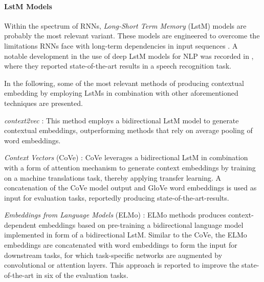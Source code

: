 \documentclass[11pt]{scrreprt}
\let\citef\cite  %
\let\cite\parencite  %
\begin{document}

\paragraph{L\gls{st}M Models}
Within the spectrum of RNNs, \textit{Long-Short Term Memory} (L\gls{st}M) models are probably the most relevant variant. These models are engineered to overcome the limitations RNNs face with long-term dependencies in input sequences \cite{hochreiterLongShortTermMemory1997, yuReviewRecurrentNeural2019}. A notable development in the use of deep L\gls{st}M models for NLP was recorded in \citef{gravesSpeechRecognitionDeep2013}, where they reported state-of-the-art results in a speech recognition task.


In the following, some of the most relevant methods of producing contextual embedding by employing
L\gls{st}Ms in combination with other aforementioned techniques are presented.

\textit{context2vec} \cite{melamudContext2vecLearningGeneric2016}: This method employs a bidirectional L\gls{st}M model to generate contextual embeddings, outperforming methods that rely on average pooling of word embeddings.

\textit{Context Vectors} (CoVe) \cite{mccannLearnedTranslationContextualized2018}: CoVe leverages a bidirectional L\gls{st}M in combination with a form of attention mechanism to generate context embeddings by training on a machine translations task, thereby applying transfer learning. A concatenation of the CoVe model output and GloVe word embeddings is used as input for evaluation tasks, reportedly producing state-of-the-art-results.

\textit{Embeddings from Language Models} (ELMo) \cite{petersDeepContextualizedWord2018}: ELMo methods produces context-dependent embeddings based on pre-training a bidirectional language model implemented in form of a bidirectional L\gls{st}M. Similar to the CoVe, the ELMo embeddings are concatenated with word embeddings to form the input for downstream tasks, for which task-specific networks are augmented by convolutional or attention layers. This approach is reported to improve the state-of-the-art in six of the evaluation tasks.

\end{document}
